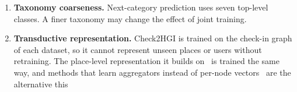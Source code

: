 \begin{enumerate}
    \item \textbf{Taxonomy coarseness.} Next-category prediction uses seven top-level
    classes. A finer taxonomy may change the effect of joint training.
    \item \textbf{Transductive representation.} Check2HGI is trained on the check-in
    graph of each dataset, so it cannot represent unseen places or users without
    retraining. The place-level representation it builds
    on~\cite{huang2023hgi} is trained the same way, and methods that learn aggregators
    instead of per-node vectors~\cite{hamilton2017graphsage} are the alternative this

\end{enumerate}
